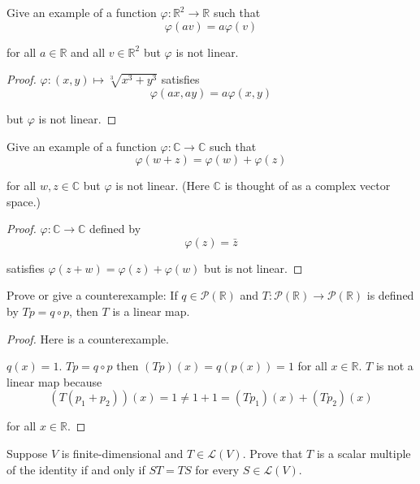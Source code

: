 \begin{exercise}
    Give an example of a function $\varphi: \mathbb{R}^{2}\to \mathbb{R}$ such that
    \[
        \varphi(av) = a\varphi(v)
    \]

    for all $a\in\mathbb{R}$ and all $v\in\mathbb{R}^{2}$ but $\varphi$ is not linear.
\end{exercise}

\begin{proof}
    $\varphi: (x, y) \mapsto \sqrt[3]{x^{3} + y^{3}}$ satisfies
    \[
        \varphi(ax, ay) = a\varphi(x, y)
    \]

    but $\varphi$ is not linear.
\end{proof}
\newpage

\begin{exercise}
    Give an example of a function $\varphi: \mathbb{C}\to \mathbb{C}$ such that
    \[
        \varphi(w + z) = \varphi(w) + \varphi(z)
    \]

    for all $w, z\in\mathbb{C}$ but $\varphi$ is not linear. (Here $\mathbb{C}$ is thought of as a complex vector space.)
\end{exercise}

\begin{proof}
    $\varphi: \mathbb{C}\to \mathbb{C}$ defined by
    \[
        \varphi(z) = \bar{z}
    \]

    satisfies $\varphi(z + w) = \varphi(z) + \varphi(w)$ but is not linear.
\end{proof}
\newpage

\begin{exercise}
    Prove or give a counterexample: If $q\in \mathcal{P}(\mathbb{R})$ and $T: \mathcal{P}(\mathbb{R})\to \mathcal{P}(\mathbb{R})$ is defined by $Tp = q\circ p$, then $T$ is a linear map.
\end{exercise}

\begin{proof}
    Here is a counterexample.

    $q(x) = 1$. $Tp = q\circ p$ then $(Tp)(x) = q(p(x)) = 1$ for all $x\in\mathbb{R}$. $T$ is not a linear map because
    \[
        (T(p_{1} + p_{2}))(x) = 1\ne 1 + 1 = (Tp_{1})(x) + (Tp_{2})(x)
    \]

    for all $x\in\mathbb{R}$.
\end{proof}
\newpage

\begin{exercise}\label{chapter3:sectionA:exercise11}
    Suppose $V$ is finite-dimensional and $T\in\mathcal{L}(V)$. Prove that $T$ is a scalar multiple of the identity if and only if $ST = TS$ for every $S\in \mathcal{L}(V)$.
\end{exercise}

